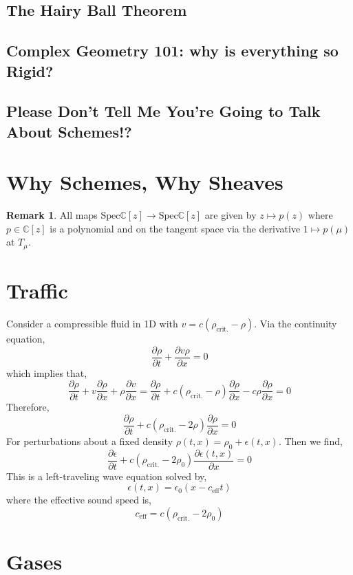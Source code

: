 \documentclass[12pt]{extarticle}
\newcommand{\pderiv}[2]{\frac{\partial{#1}}{\partial{#2}}}
\theoremstyle{definition}
\newtheorem{remark}{Remark}
\newcommand{\C}{\mathbb{C}}
\begin{document}
\subsection{The Hairy Ball Theorem}

\subsection{Complex Geometry 101: why is everything so Rigid?}

\subsection{Please Don't Tell Me You're Going to Talk About Schemes!?}

\section{Why Schemes, Why Sheaves}

\begin{remark}
All maps $\mathrm{Spec}{\C[z]} \to \mathrm{Spec}{\C[z]}$ are given by $z \mapsto p(z)$ where $p \in \C[z]$ is a polynomial and on the tangent space via the derivative $1 \mapsto p(\mu)$ at $T_\mu$. 
\end{remark}

\section{Traffic}

Consider a compressible fluid in 1D with $v = c(\rho_{\text{crit.}} - \rho)$. Via the continuity equation,
\[ \pderiv{\rho}{t} + \pderiv{v \rho}{x} = 0 \]
which implies that,
\[ \pderiv{\rho}{t} + v \pderiv{\rho}{x} + \rho \pderiv{v}{x} = \pderiv{\rho}{t} + c(\rho_{\text{crit}.} - \rho) \pderiv{\rho}{x} - c \rho \pderiv{\rho}{x} = 0 \]
Therefore,
\[ \pderiv{\rho}{t} + c(\rho_{\text{crit}.} - 2 \rho) \pderiv{\rho}{x} = 0 \]
For perturbations about a fixed density $\rho(t,x) = \rho_0 + \epsilon(t, x)$. Then we find,
\[ \pderiv{\epsilon}{t} + c(\rho_{\text{crit}.} - 2 \rho_0 ) \pderiv{\epsilon(t, x)}{x} = 0 \]
This is a left-traveling wave equation solved by,
\[ \epsilon(t, x) = \epsilon_0(x - c_{\text{eff}} t ) \]
where the effective sound speed is,
\[ c_{\text{eff}} = c(\rho_{\text{crit}.} - 2 \rho_0) \] 


\section{Gases}
\end{document}
